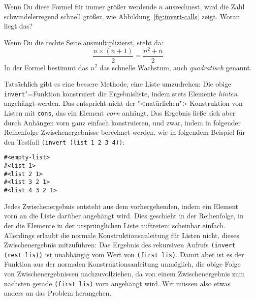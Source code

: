 \noindent Wenn Du diese Formel für immer größer werdende $n$ ausrechnest, wird
die Zahl schwindelerregend schnell größer, wie
Abbildung~\ref{fig:invert-calls} zeigt.  Woran liegt das?

Wenn Du die rechte Seite ausmultiplizierst, steht da:
\[ \frac{n\times (n+1)}{2} = \frac{n^2 + n}{2} \]
%
In der Formel bestimmt das $n^2$ das schnelle Wachstum, auch
\textit{quadratisch} genannt.

Tatsächlich gibt es eine bessere Methode, eine Liste umzudrehen: Die
obige \lstinline{invert}"=Funktion konstruiert die Ergebnisliste, indem
stets Elemente \emph{hinten} angehängt werden.  Das entspricht 
nicht der "<natürlichen"> Konstruktion von Listen mit
\lstinline{cons}, das ein Element \emph{vorn} anhängt.  
Das Ergebnis ließe sich aber durch Anhängen vorn ganz einfach
konstruieren, und zwar, indem in folgender Reihenfolge
Zwischenergebnisse berechnet werden, wie in folgendem Beispiel für den
Testfall \lstinline{(invert (list 1 2 3 4))}:
%
\begin{lstlisting}
#<empty-list>
#<list 1>
#<list 2 1>
#<list 3 2 1>
#<list 4 3 2 1>
\end{lstlisting}
%
Jedes Zwischenergebnis entsteht aus dem vorhergehenden, indem ein
Element vorn an die Liste darüber angehängt wird.  Dies geschieht in
der Reihenfolge, in der die Elemente in der ursprünglichen Liste
auftreten: scheinbar einfach.  Allerdings erlaubt die normale
Konstruktionsanleitung für Listen nicht, dieses Zwischenergebnis
mitzuführen: Das Ergebnis des rekursiven Aufrufs
\lstinline{(invert (rest lis))} ist unabhängig vom Wert von
\lstinline{(first lis)}.  Damit aber
ist es der Funktion aus der normalen Konstruktionsanleitung unmöglich,
die obige Folge von Zwischenergebnissen nachzuvollziehen, da von einem
Zwischenergebnis zum nächsten gerade \lstinline{(first lis)} vorn
angehängt wird.  Wir müssen also etwas anders an das Problem herangehen.

